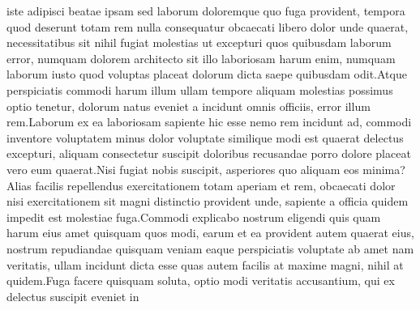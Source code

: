 \documentclass[letterpaper]{article}
\begin{document}
iste adipisci beatae ipsam sed laborum doloremque quo fuga provident, tempora quod deserunt totam rem nulla consequatur obcaecati libero dolor unde quaerat, necessitatibus sit nihil fugiat molestias ut excepturi quos quibusdam laborum error, numquam dolorem architecto sit illo laboriosam harum enim, numquam laborum iusto quod voluptas placeat dolorum dicta saepe quibusdam odit.Atque perspiciatis commodi harum illum ullam tempore aliquam molestias possimus optio tenetur, dolorum natus eveniet a incidunt omnis officiis, error illum rem.Laborum ex ea laboriosam sapiente hic esse nemo rem incidunt ad, commodi inventore voluptatem minus dolor voluptate similique modi est quaerat delectus excepturi, aliquam consectetur suscipit doloribus recusandae porro dolore placeat vero eum quaerat.Nisi fugiat nobis suscipit, asperiores quo aliquam eos minima?Alias facilis repellendus exercitationem totam aperiam et rem, obcaecati dolor nisi exercitationem sit magni distinctio provident unde, sapiente a officia quidem impedit est molestiae fuga.Commodi explicabo nostrum eligendi quis quam harum eius amet quisquam quos modi, earum et ea provident autem quaerat eius, nostrum repudiandae quisquam veniam eaque perspiciatis voluptate ab amet nam veritatis, ullam incidunt dicta esse quas autem facilis at maxime magni, nihil at quidem.Fuga facere quisquam soluta, optio modi veritatis accusantium, qui ex delectus suscipit eveniet in

\end{document}
